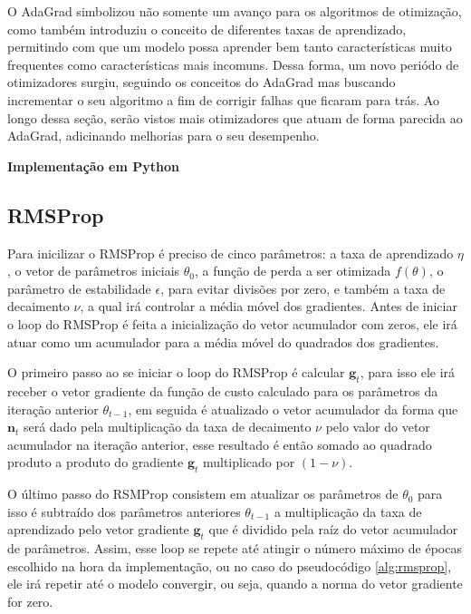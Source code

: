 O AdaGrad simbolizou não somente um avanço para os algoritmos de otimização, como também introduziu o conceito de diferentes taxas de aprendizado, permitindo com que um modelo possa aprender bem tanto características muito frequentes como características mais incomuns. Dessa forma, um novo periódo de otimizadores surgiu, seguindo os conceitos do AdaGrad mas buscando incrementar o seu algoritmo a fim de corrigir falhas que ficaram para trás. Ao longo dessa seção, serão vistos mais otimizadores que atuam de forma parecida ao AdaGrad, adicinando melhorias para o seu desempenho.

\textbf{Implementação em Python}

\subsection{RMSProp}

Para inicilizar o RMSProp é preciso de cinco parâmetros: a taxa de aprendizado $\eta$, o vetor de parâmetros iniciais $\theta_0$, a função de perda a ser otimizada $f(\theta)$, o parâmetro de estabilidade $\epsilon$, para evitar divisões por zero, e também a taxa de decaimento $\nu$, a qual irá controlar a média móvel dos gradientes. Antes de iniciar o loop do RMSProp é feita a inicialização do vetor acumulador com zeros, ele irá atuar como um acumulador para a média móvel do quadrados dos gradientes.

O primeiro passo ao se iniciar o loop do RMSProp é calcular $\textbf{g}_t$, para isso ele irá receber o vetor gradiente da função de custo calculado para os parâmetros da iteração anterior $\theta_{t-1}$, em seguida é atualizado o vetor acumulador da forma que $\textbf{n}_t$ será dado pela multiplicação da taxa de decaimento $\nu$ pelo valor do vetor acumulador na iteração anterior, esse resultado é então somado ao quadrado produto a produto do gradiente $\textbf{g}_t$ multiplicado por $(1 - \nu)$.

O último passo do RSMProp consistem em atualizar os parâmetros de $\theta_0$ para isso é subtraído dos parâmetros anteriores $\theta_{t-1}$ a multiplicação da taxa de aprendizado pelo vetor gradiente $\textbf{g}_t$ que é dividido pela raíz do vetor acumulador de parâmetros. Assim, esse loop se repete até atingir o número máximo de épocas escolhido na hora da implementação, ou no caso do pseudocódigo \ref{alg:rmsprop}, ele irá repetir até o modelo convergir, ou seja, quando a norma do vetor gradiente for zero.

